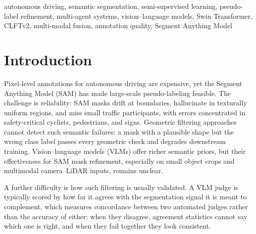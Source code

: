\documentclass[conference]{IEEEtran}
\begin{document}
\begin{abstract}
Fourth, cross-model agreement is not a proxy for accuracy: the ranking of the two VLMs inverts when they are scored against human verdicts instead of against each other, the aggregate ordering is set by the class composition of the corpus rather than by competence, and prompt portability fails per-prompt and per-class rather than uniformly.
Against all of this, deleting the 5.3\,\% of object pixels a human rejected, at fixed training-set size, is worth $+2.5$ mIoU: label purity, not verification and not volume, is the binding constraint.
We close with the cost accounting the human reference makes possible --- at this model scale a VLM spends several times more machine time on a frame than a human needs to verify it by hand --- and note that all decisions trace to explicit agent outputs with no learned fusion weights, so every variant is reproducible from stored responses without re-running VLM inference.
\end{abstract}

\begin{IEEEkeywords}
autonomous driving, semantic segmentation, semi-supervised learning, pseudo-label refinement, multi-agent systems, vision–language models, Swin Transformer, CLFTv2, multi-modal fusion, annotation quality, Segment Anything Model
\end{IEEEkeywords}

\section{Introduction}

Pixel-level annotations for autonomous driving are expensive, yet the Segment Anything Model (SAM) \cite{kirillov2023sam} has made large-scale pseudo-labeling feasible.
The challenge is reliability: SAM masks drift at boundaries, hallucinate in texturally uniform regions, and miss small traffic participants, with errors concentrated in safety-critical cyclists, pedestrians, and signs.
Geometric filtering approaches \cite{zou2019confidence,lee2013pseudo,jaritz2020xmuda} cannot detect such semantic failures: a mask with a plausible shape but the wrong class label passes every geometric check and degrades downstream training.
Vision–language models (VLMs) \cite{liu2024llava,wang2024qwen2vl} offer richer semantic priors, but their effectiveness for SAM mask refinement, especially on small object crops and multimodal camera–LiDAR inputs, remains unclear.

A further difficulty is how such filtering is usually validated. A VLM judge is typically scored by how far it agrees with the segmentation signal it is meant to complement, which measures concordance between two automated judges rather than the accuracy of either: when they disagree, agreement statistics cannot say which one is right, and when they fail together they look consistent.
\end{document}

